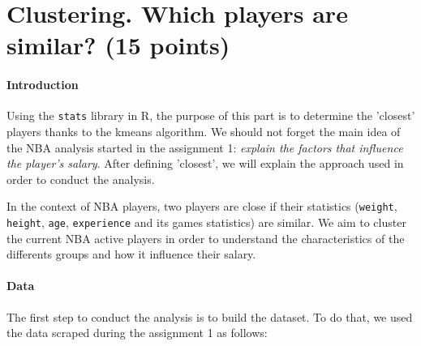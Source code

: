 \section*{Clustering. Which players are similar? (15 points)}
\label{subsec:3Q1}

\paragraph{Introduction}Using the \texttt{stats} library in R, the purpose of this part is to determine the 'closest' players thanks to the kmeans algorithm. We should not forget the main idea of the NBA analysis started in the assignment 1: \textit{explain the factors that influence the player's salary}. After defining 'closest', we will explain the approach used in order to conduct the analysis.

In the context of NBA players, two players are close if their statistics (\texttt{weight}, \texttt{height}, \texttt{age}, \texttt{experience} and its games statistics) are similar. We aim to cluster the current NBA active players in order to understand the characteristics of the differents groups and how it influence their salary.

\paragraph{Data}The first step to conduct the analysis is to build the dataset. To do that, we used the data scraped during the assignment 1 as follows:

